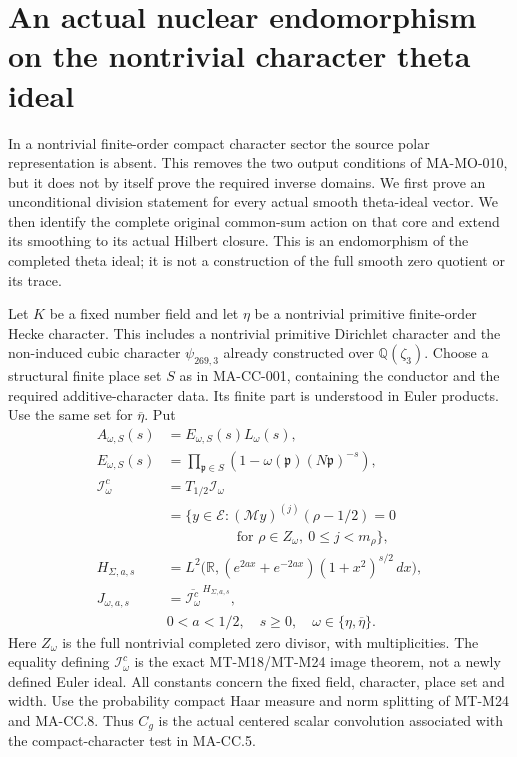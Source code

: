 \section{An actual nuclear endomorphism on the nontrivial character theta ideal}
\label{sec:character-common-sum-transport}

In a nontrivial finite-order compact character sector the source polar
representation is absent. This removes the two output conditions of
MA-MO-010, but it does not by itself prove the required inverse domains.
We first prove an unconditional division statement for every actual
smooth theta-ideal vector. We then identify the complete original
common-sum action on that core and extend its smoothing to its actual
Hilbert closure. This is an endomorphism of the completed theta ideal;
it is not a construction of the full smooth zero quotient or its trace.

Let \(K\) be a fixed number field and let \(\eta\) be a nontrivial
primitive finite-order Hecke character. This includes a nontrivial
primitive Dirichlet character and the non-induced cubic character
\(\psi_{269,3}\) already constructed over \(\mathbb Q(\zeta_3)\).
Choose a structural finite place set \(S\) as in MA-CC-001,
containing the conductor and the required additive-character data.
Its finite part is understood in Euler products. Use the same set
for \(\overline\eta\). Put
\[
 \begin{aligned}
 A_{\omega,S}(s)&=E_{\omega,S}(s)L_\omega(s),\\
 E_{\omega,S}(s)&=\prod_{\mathfrak p\in S}
          (1-\omega(\mathfrak p)(N\mathfrak p)^{-s}),\\
 \mathscr I^c_\omega&=T_{1/2}\mathcal I_\omega\\
       &=\{y\in\mathcal E:(\mathcal My)^{(j)}(\rho-1/2)=0\\
       &\hspace{5em}\text{for }\rho\in Z_\omega,
                                      \ 0\le j<m_\rho\},\\
 H_{\Sigma,a,s}&=L^2\bigl(\mathbb R,
         (e^{2ax}+e^{-2ax})(1+x^2)^{s/2}\,dx\bigr),\\
 J_{\omega,a,s}&=\overline{\mathscr I^c_\omega}^{\,H_{\Sigma,a,s}},\\
 &0<a<1/2,\quad s\ge0,\quad\omega\in\{\eta,\overline\eta\}.
 \end{aligned}
 \tag{MA-MO.170}
\]
Here \(Z_\omega\) is the full nontrivial completed zero divisor,
with multiplicities. The equality defining \(\mathscr I^c_\omega\) is the exact
MT-M18/MT-M24 image theorem, not a newly defined Euler ideal.
All constants concern the fixed field, character, place set and width.
Use the probability compact Haar measure and norm splitting of MT-M24
and MA-CC.8. Thus \(C_g\) is the actual centered scalar convolution
associated with the compact-character test in MA-CC.5.

